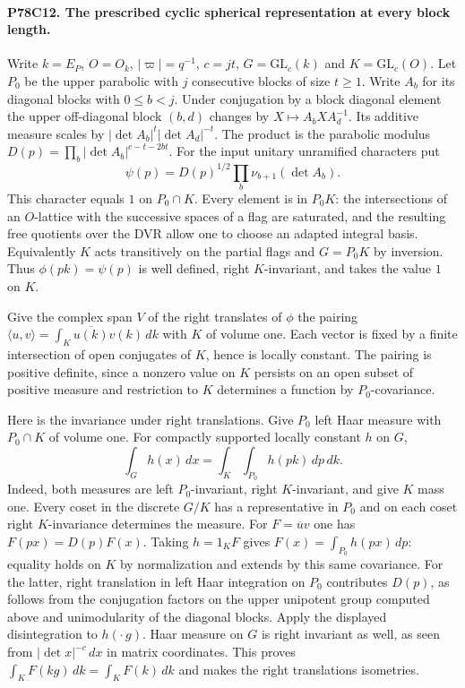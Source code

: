 \paragraph{P78C12. The prescribed cyclic spherical representation at every block length.}
Write $k=E_P$, $O=O_k$, $|\varpi|=q^{-1}$, $c=jt$, $G=\mathrm{GL}_c(k)$
and $K=\mathrm{GL}_c(O)$. Let $P_0$ be the upper parabolic with $j$
consecutive blocks of size $t\ge1$. Write $A_b$ for its diagonal blocks
with $0\le b<j$. Under conjugation by a block diagonal element the
upper off-diagonal block $(b,d)$ changes by $X\mapsto A_bXA_d^{-1}$.
Its additive measure scales by
$|\det A_b|^t|\det A_d|^{-t}$. The product is the parabolic modulus
$D(p)=\prod_b|\det A_b|^{c-t-2bt}$. For the input unitary unramified
characters put
\[
 \psi(p)=D(p)^{1/2}\prod_b\nu_{b+1}(\det A_b).
\]
This character equals $1$ on $P_0\cap K$. Every element is in $P_0K$:
the intersections of an $O$-lattice with the successive spaces of a
flag are saturated, and the resulting free quotients over the DVR allow
one to choose an adapted integral basis. Equivalently $K$ acts
transitively on the partial flags and $G=P_0K$ by inversion.
Thus $\phi(pk)=\psi(p)$ is well defined, right $K$-invariant, and takes
the value $1$ on $K$.

Give the complex span $V$ of the right translates of $\phi$ the pairing
$\langle u,v\rangle=\int_K\overline{u(k)}v(k)\,dk$ with $K$ of
volume one. Each vector is fixed by a finite intersection of open
conjugates of $K$, hence is locally constant. The pairing is positive
definite, since a nonzero value on $K$ persists on an open subset of
positive measure and restriction to $K$ determines a function by
$P_0$-covariance.

Here is the invariance under right translations. Give $P_0$ left Haar
measure with $P_0\cap K$ of volume one. For compactly supported locally
constant $h$ on $G$,
\[
       \int_G h(x)\,dx=\int_K\int_{P_0} h(pk)\,dp\,dk.
\]
Indeed, both measures are left $P_0$-invariant, right $K$-invariant,
and give $K$ mass one. Every coset in the discrete $G/K$ has a
representative in $P_0$ and on each coset right $K$-invariance
determines the measure. For $F=\overline u v$ one has
$F(px)=D(p)F(x)$. Taking $h=1_K F$ gives
$F(x)=\int_{P_0}h(px)\,dp$: equality holds on $K$ by normalization
and extends by this same covariance. For the latter, right translation
in left Haar integration on $P_0$ contributes $D(p)$, as follows from
the conjugation factors on the upper unipotent group computed above
and unimodularity of the diagonal blocks. Apply the displayed
disintegration to $h(\cdot\,g)$. Haar measure on $G$ is right
invariant as well, as seen from $|\det x|^{-c}\,dx$ in matrix
coordinates. This proves $\int_K F(kg)\,dk=\int_K F(k)\,dk$ and makes
the right translations isometries.

